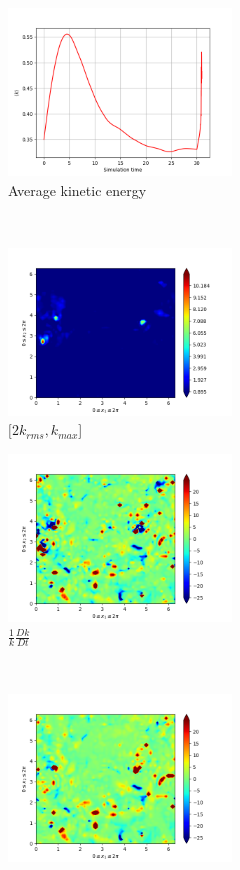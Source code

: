 \begin{figure}[H]
    \begin{subfigure}[H]{0.45\textwidth}
        \includegraphics[height=1.75in]{media/run-cds-65/ke-average1460.png}
        \caption{Average kinetic energy}
    \end{subfigure}
    ~
    \begin{subfigure}[H]{0.45\textwidth}
        \includegraphics[height=1.75in]{media/run-cds-65/ke-2-1460.png}
        \caption{$[2k_{rms}, k_{max} $] }
    \end{subfigure}
    \newline
    \begin{subfigure}[H]{0.45\textwidth}
        \includegraphics[height=1.75in]{media/run-cds-65/ke-1460.png}
        \caption{$\frac{1}{k} \frac{D k}{Dt}$}
    \end{subfigure}
    ~
    \begin{subfigure}{0.45\textwidth}
        \includegraphics[height=1.75in]{media/run-cds-65/A-ke-1460.png}

\end{subfigure}
\end{figure}
